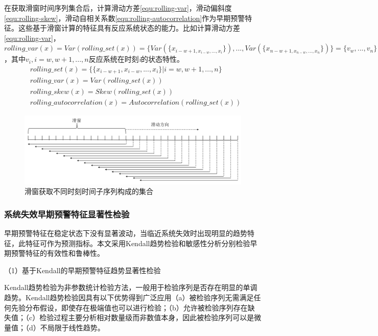 在获取滑窗时间序列集合后，计算滑动方差\ref{equ:rolling-var}，滑动偏斜度\ref{equ:rolling-skew}，滑动自相关系数\ref{equ:rolling-autocorrelation}作为早期预警特征。这些基于滑窗计算的特征具有反应系统状态的能力。比如计算滑动方差\ref{equ:rolling-var}，$rolling\_var(x)=Var(rolling\_set(x))=\{Var(\{x_{i-w+1,x_{i-w}, ..., x_{i}}\}), ..., Var(\{x_{n-w+1,x_{n-w}, ..., x_{n}}\})\}=\{v_{w}, ..., v_{n}\}$，其中$v_{i}, i=w,w+1,...,n$反应系统在时刻\emph{i}的状态特性。
\begin{subequations}
\begin{align}
& rolling\_set(x) = \{\{x_{i-w+1}, x_{i-w}, ..., x_{i}\} | i=w, w+1, ..., n\} \label{equ:rolling-set} \\[0.1cm]
& rolling\_var(x) = Var(rolling\_set(x)) \label{equ:rolling-var} \\[0.1cm]
& rolling\_skew(x) = Skew(rolling\_set(x)) \label{equ:rolling-skew} \\[0.1cm]
& rolling\_autocorrelation(x) = Autocorrelation(rolling\_set(x)) \label{equ:rolling-autocorrelation}
\end{align}
\end{subequations}

\begin{figure}[H]
\centering
\includegraphics[scale=0.5]{figures/csd-main-sliding-window.png}
\caption{滑窗获取不同时刻时间子序列构成的集合}
\label{fig:csd-main-sliding-window}
\end{figure}

\subsubsection{系统失效早期预警特征显著性检验}

早期预警特征在稳定状态下没有显著波动，当临近系统失效时出现明显的趋势特征，此特征可作为预测指标。本文采用Kendall趋势检验和敏感性分析分别检验早期预警特征的有效性和鲁棒性。

（1）基于Kendall的早期预警特征趋势显著性检验

Kendall趋势检验为非参数统计检验方法，一般用于检验序列是否存在明显的单调趋势。Kendall趋势检验因具有以下优势得到广泛应用（a）被检验序列无需满足任何先验分布假设，即使存在极端值也可以进行检验；（b）允许被检验序列存在缺失值；（c）检验过程主要分析相对数量级而非数值本身，因此被检验序列可以是微量值；（d）不局限于线性趋势。

